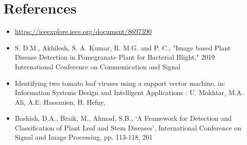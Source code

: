 \documentclass{article}
\begin{document}
\section{References}
\begin{itemize}
  \item \url{https://ieeexplore.ieee.org/document/8697390 }
  \item S. D.M., Akhilesh, S. A. Kumar, R. M.G. and P. C., "Image based Plant Disease Detection in Pomegranate Plant for Bacterial Blight," 2019 International Conference on Communication and Signal 
  \item Identifying two tomato leaf viruses using a support vector machine, in: Information Systems Design and Intelligent Applications : U. Mokhtar, M.A. Ali, A.E. Hassanien, H. Hefny,
  \item Bashish,   D.A.,   Braik,  M.,  Ahmad,  S.B.,  ‘A  Framework  for Detection and Classification of Plant Leaf and Stem Diseases’, International  Conference  on  Signal  and  Image  Processing,  pp. 113-118, 201 

\end{itemize}


 
\end{document}
